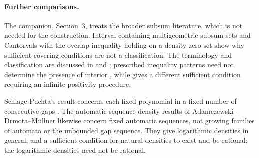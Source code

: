 \documentclass[11pt]{article}
\begin{document}
\paragraph{Further comparisons.}
The companion, Section~3, treats the broader subsum literature, which is
not needed for the construction.  Interval-containing multigeometric
subsum sets \cite[Theorem~2]{bartoszewicz2014} and Cantorvals with the
overlap inequality holding on a density-zero set
\cite[Theorem]{prusptak2024} show why sufficient covering conditions are
not a classification.  The terminology and classification are discussed
in \cite[\S1]{glabprus2025} and
\cite[Theorem~14 of the consulted preprint]{nitecki2015}; prescribed
inequality patterns need not determine the presence of interior
\cite[Theorem~2]{miskaprusptak2023}, while
\cite[Definition~2, Theorem~3.1]{nowakowski2025} gives a different
sufficient condition requiring an infinite positivity procedure.

Schlage-Puchta's result concerns each fixed polynomial in a fixed number
of consecutive gaps \cite[Lemma~4]{schlagepuchta2011}.
The automatic-sequence density results of Adamczewski--Drmota--M\"ullner
\cite[Theorems~1.2, 1.4]{adm2022} likewise concern fixed automatic
sequences, not growing families of automata or the unbounded gap sequence.
They give logarithmic densities in general, and a sufficient condition
for natural densities to exist and be rational; the logarithmic densities
need not be rational.
\end{document}

